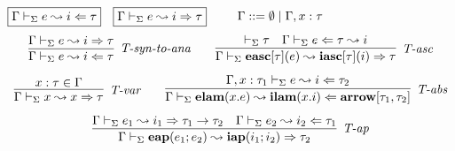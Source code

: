 \begin{figure}
$\fbox{$\Gamma \vdash_\Sigma e \leadsto i \Leftarrow \tau$}$~
$\fbox{$\Gamma \vdash_\Sigma e \leadsto i \Rightarrow \tau$}$~~~~
$\Gamma ::= \emptyset \mathrel{\mid} \Gamma, x : \tau$
\[
\begin{array}{c}
\infer[\textit{T-syn-to-ana}]
	{\Gamma \vdash_\Sigma  e \leadsto i\Leftarrow \tau } 
	{\Gamma \vdash_\Sigma e  \leadsto i\Rightarrow \tau  }
~~~~~~
\infer[\textit{T-asc}]
	{\Gamma  \vdash_\Sigma \keyw{easc}[\tau](e) \leadsto \keyw{iasc}[\tau](i) \Rightarrow \tau}
	{\vdash_\Sigma \tau & \Gamma \vdash_\Sigma e \Leftarrow \tau \leadsto i } \\[2ex]

\infer[\textit{T-var}]
	{\Gamma \vdash_\Sigma x \leadsto x \Rightarrow\tau } 
	{x:\tau \in \Gamma }
~~~~~~
\infer[\textit{T-abs}]
	{\Gamma \vdash_\Sigma  \keyw{elam}(x . e) \leadsto \keyw{ilam}(x .i) \Leftarrow \keyw{arrow}[\tau_1, \tau_2]} 
	{\Gamma, x:\tau_1 \vdash_\Sigma e\leadsto i\Leftarrow \tau_2 }\\[2ex]

\infer[\textit{T-ap}]
	{\Gamma \vdash_\Sigma  \keyw{eap}(e_1; e_2) \leadsto \keyw{iap}(i_1; i_2) \Rightarrow \tau_2  } 
	{\Gamma \vdash_\Sigma e_1 \leadsto i_1 \Rightarrow \tau_1 \rightarrow \tau_2    & \Gamma \vdash_\Sigma e_2  \leadsto i_2 \Leftarrow \tau_1}\\[2ex]


\end{array}\]
\end{figure}
